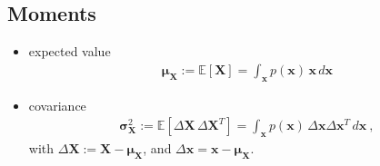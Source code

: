 \documentclass[letterpaper,10pt,english]{jupyterBook}
\begin{document}
\subsection{Moments}
\label{\detokenize{ch/prob/rv-multi-dimensional:moments}}\label{\detokenize{ch/prob/rv-multi-dimensional:prb-multidim-moments}}\begin{itemize}
\item {} 
\sphinxAtStartPar
expected value
\begin{equation*}
\begin{split}\boldsymbol{\mu}_{\mathbf{X}} := \mathbb{E}\left[ \mathbf{X} \right] = \int_{\mathbf{x}} p(\mathbf{x}) \, \mathbf{x} \,  d \mathbf{x}\end{split}
\end{equation*}
\item {} 
\sphinxAtStartPar
covariance
\begin{equation*}
\begin{split}\boldsymbol{\sigma}^2_{\mathbf{X}} := \mathbb{E} \left[ \Delta \mathbf{X} \, \Delta \mathbf{X}^T \right] = \int_{\mathbf{x}} p(\mathbf{x}) \, \Delta \mathbf{x} \Delta \mathbf{x}^T \, d \mathbf{x} \ ,\end{split}
\end{equation*}
\sphinxAtStartPar
with \(\Delta \mathbf{X} := \mathbf{X} - \boldsymbol{\mu}_{\mathbf{X}} \), and \(\Delta \mathbf{x} = \mathbf{x} - \boldsymbol{\mu}_{\mathbf{X}}\).


\end{itemize}
\end{document}

